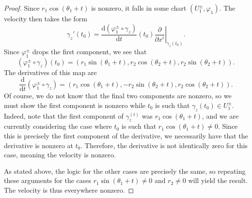 \documentclass[11pt, letterpaper]{article}
\theoremstyle{plain}
\begin{document}
\begin{proof}
	Since $r_1 \cos (\theta _1+t)$ is nonzero, it falls in some chart $(U^{\pm}_1,\varphi _1)$. The velocity then takes the form
	\[
		\gamma_z '(t_0)= \frac{\mathrm{d}\left( \varphi ^{\pm}_1 \circ \gamma _z \right) }{\mathrm{d}t} (t_0) \left. \frac{\partial }{\partial x^i} \right|_{\gamma_z (t_0)} 
	.\]
	Since $\varphi_1^{\pm} $ drops the first component, we see that
	\[
		(\varphi _1^{\pm}\circ\gamma _z)(t_0)=(r_1 \sin (\theta _1+t),r_2 \cos (\theta_2+t),r_2 \sin (\theta _2+t))
	.\]
	The derivatives of this map are
	\[
		\frac{\mathrm{d}}{\mathrm{d}t} (\varphi^{\pm}_1\circ \gamma _z)=\left( r_1 \cos (\theta _1+t), -r_2 \sin (\theta _2+t),r_2 \cos (\theta _2+t) \right) 
	.\]
	Of course, we do not know that the final two components are nonzero, so we must show the first component is nonzero while $t_0$ is such that $\gamma _z(t_0)\in U^{\pm}_1$. Indeed, note that the first component of $\gamma _z^(t)$ was $r_1 \cos (\theta _1+t)$, and we are currently considering the case where $t_0$ is such that $r_1 \cos (\theta _1+t)\neq 0$. Since this is precisely the first component of the derivative, we necessarily have that the derivative is nonzero at $t_0$. Therefore, the derivative is not identically zero for this case, meaning the velocity is nonzero.


	As stated above, the logic for the other cases are precisely the same, so repeating these arguments for the cases $r_1 \sin (\theta _1+t)\neq 0$ and $r_2 \neq 0$ will yield the result. The velocity is thus everywhere nonzero.
\end{proof}
\end{document}
